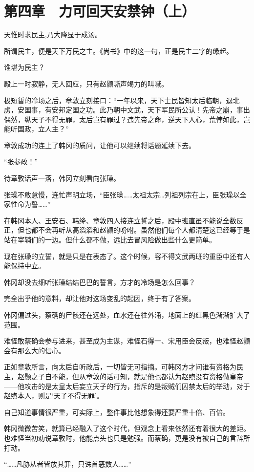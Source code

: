\section{第四章　力可回天安禁钟（上）}

天惟时求民主,乃大降显于成汤。

所谓民主，便是天下万民之主。《尚书》中的这一句，正是民主二字的缘起。

谁堪为民主？

殿上一时寂静，无人回应，只有赵颢嘶声竭力的叫喊。

极短暂的冷场之后，章敦立刻接口：“一年以来，天下士民皆知太后临朝，退北虏，安国事，有安邦定国之功。此乃朝中文武，天下军民所公认！先帝之崩，事出偶然，纵天子不得无罪，太后岂有罪过？违先帝之命，逆天下人心，荒悖如此，岂能听国政，立人主？”

章敦成功的连上了韩冈的质问，让他可以继续将话题延续下去。

“张参政！”

待章敦话声一落，韩冈立刻看向张璪。

张璪不敢怠慢，连忙声明立场，“臣张璪……太祖太宗…列祖列宗在上，臣张璪以全家性命为誓……”

在韩冈本人、王安石、韩绛、章敦四人接连立誓之后，殿中班直虽不能说全数反正，但也都不会再听从高滔滔和赵颢的吩咐。虽然他们每个人都清楚这已经等于是站在宰辅们的一边。但什么都不做，远比去冒风险做出些什么更简单。

现在张璪的立誓，就是只是在表态了。这个时候，容不得文武两班的重臣中还有人能保持中立。

韩冈却没去细听张璪结结巴巴的誓言，方才的冷场是怎么回事？

完全出乎他的意料，却让他对这场变乱的起因，终于有了答案。

韩冈偏过头，蔡确的尸骸还在远处，血水还在往外涌，地面上的红黑色渐渐扩大了范围。

难怪敢蔡确会参与进来，甚至成为主谋，难怪石得一、宋用臣会反叛，也难怪赵颢会有那么大的信心。

正如章敦所言，向太后自听政后，一切皆无可指摘。可韩冈方才问谁有资格为民主，赵颢之子自不能，但从章敦的话可知，就是他也都认为赵煦没有资格做皇帝——他攻击的是太皇太后妄立天子的行为，指斥的是叛贼们囚禁太后的举动，对于赵煦本人，则是‘天子不得无罪’。

自己知道事情很严重，可实际上，整件事比他想象得还要严重十倍、百倍。

韩冈微微苦笑，就算已经融入了这个时代，但观念上看来依然还有着很大的差距。也难怪当初劝说章敦时，他能点头也只是勉强。而蔡确，更是没有被自己的言辞所打动。

“……凡胁从者皆放其罪，只诛首恶数人……”


